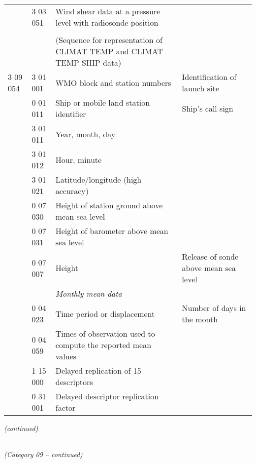 \begin{longtable}[]{@{}llll@{}}
& 3 03 051 & Wind shear data at a pressure level with radiosonde position &\tabularnewline
& & &\tabularnewline
& & (Sequence for representation of CLIMAT TEMP and CLIMAT TEMP SHIP data) &\tabularnewline
3 09 054 & 3 01 001 & WMO block and station numbers & Identification of launch site\tabularnewline
& 0 01 011 & Ship or mobile land station identifier & Ship's call sign\tabularnewline
& 3 01 011 & Year, month, day &\tabularnewline
& 3 01 012 & Hour, minute &\tabularnewline
& 3 01 021 & Latitude/longitude (high accuracy) &\tabularnewline
& 0 07 030 & Height of station ground above mean sea level &\tabularnewline
& 0 07 031 & Height of barometer above mean sea level &\tabularnewline
& 0 07 007 & Height & Release of sonde above mean sea level\tabularnewline
& & \emph{Monthly mean data} &\tabularnewline
& 0 04 023 & Time period or displacement & Number of days in the month\tabularnewline
& 0 04 059 & Times of observation used to compute the reported mean values &\tabularnewline
& 1 15 000 & Delayed replication of 15 descriptors &\tabularnewline
& 0 31 001 & Delayed descriptor replication factor &\tabularnewline
\bottomrule
\end{longtable}

\emph{(continued)}

\emph{\\
(Category 09 -- continued)}

